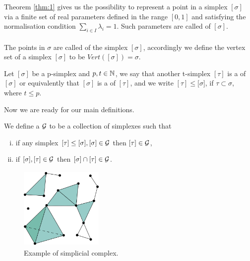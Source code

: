 \documentclass[../1.tex]{subfiles}
\begin{document}
    Theorem \ref{thm:1} gives us the possibility to represent a point in a simplex $[\sigma]$ via a finite set of real parameters defined in the range $[0,1]$
    and satisfying the normalisation condition $\sum_{i \in I } \lambda_i = 1$. Such parameters are called  of $[\sigma]$.\\
    \hfill \\
    The points in $\sigma$ are called  of the simplex $[\sigma]$, accordingly we define the vertex set of a simplex $[\sigma]$ to be 
    $Vert([\sigma]) = \sigma$.
    
    \begin{defn}
        Let $[\sigma]$ be a p-simplex and $p,t \in \mathbb{N}$, we say that another t-simplex $[\tau]$ is a  of $[\sigma]$ or equivalently 
        that $[\sigma]$ is a  of $[\tau]$, and we write $[\tau] \leq [\sigma$], if $\tau \subset \sigma$, where $t \leq p$.
    \end{defn}

    Now we are ready for our main definitions.
    
    \begin{defn}
        We define a  $\mathcal{G}$ to be a collection of simplexes such that
        \begin{enumerate}[(i)]
            \item if any simplex $ [\tau] \leq [\sigma], [\sigma] \in \mathcal{G}$ then $ [\tau] \in \mathcal{G}$,
            \item if $ [\sigma], [\tau] \in \mathcal{G}$ then $[\sigma] \cap [\tau] \in \mathcal{G}$.
        \end{enumerate}
    \end{defn}

    
    \begin{figure}[h]
        \centering
        \includegraphics[width=4cm, height=4cm]{sections/1/complex}
        \caption{Example of simplicial complex.}
        \label{fig:1}
    \end{figure} 
\end{document}
